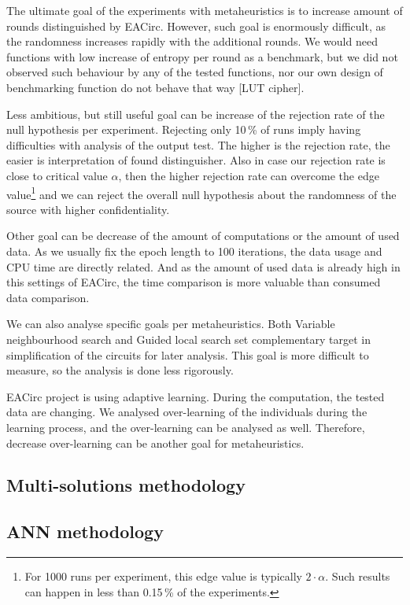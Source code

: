 \documentclass[
  print, %
  Table,   %
  nolof,     %
  nolot,     %
  11pt, %
  oneside  %
]{fithesis3}
\begin{document}
The ultimate goal of the experiments with metaheuristics is to increase amount of rounds distinguished by EACirc. However, such goal is enormously difficult, as the randomness increases rapidly with the additional rounds. We would need functions with low increase of entropy per round as a benchmark, but we did not observed such behaviour by any of the tested functions, nor our own design of benchmarking function do not behave that way [LUT cipher].

Less ambitious, but still useful goal can be increase of the rejection rate of the null hypothesis per experiment. Rejecting only 10\,\% of runs imply having difficulties with analysis of the output test. The higher is the rejection rate, the easier is interpretation of found distinguisher. Also in case our rejection rate is close to critical value $\alpha$, then the higher rejection rate can overcome the edge value\footnote{For 1000 runs per experiment, this edge value is typically $2\cdot\alpha$. Such results can happen in less than 0.15\,\% of the experiments.} and we can reject the overall null hypothesis about the randomness of the source with higher confidentiality.

Other goal can be decrease of the amount of computations or the amount of used data. As we usually fix the epoch length to 100 iterations, the data usage and CPU time are directly related. And as the amount of used data is already high in this settings of EACirc, the time comparison is more valuable than consumed data comparison.

We can also analyse specific goals per metaheuristics. Both Variable neighbourhood search and Guided local search set complementary target in simplification of the circuits for later analysis. This goal is more difficult to measure, so the analysis is done less rigorously.

EACirc project is using adaptive learning. During the computation, the tested data are changing. We analysed over-learning of the individuals during the learning process, and the over-learning can be analysed as well. Therefore, decrease over-learning can be another goal for metaheuristics.

\subsection{Multi-solutions methodology}
\subsection{ANN methodology}
\end{document}
